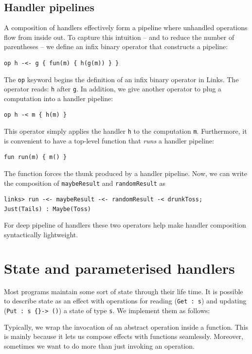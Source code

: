 \documentclass[12pt,mscres,cdtppar,twoside,openright,logo,rightchapter,normalheadings]{infthesis}
\theoremstyle{definition}
\begin{document}
\subsection{Handler pipelines}
A composition of handlers effectively form a pipeline where unhandled
operations flow from inside out. To capture this intuition -- and to
reduce the number of parentheses -- we define an infix binary operator
that constructs a pipeline:
%
\begin{lstlisting}
op h -<- g { fun(m) { h(g(m)) } }
\end{lstlisting}
%
The \lstinline$op$ keyword begins the definition of an infix binary
operator in Links. The operator reads: \lstinline$h$ after
\lstinline$g$. In addition, we give another operator to plug a
computation into a handler pipeline:
%
\begin{lstlisting}
op h -< m { h(m) }
\end{lstlisting}
%
This operator simply applies the handler \lstinline$h$ to the
computation \lstinline$m$. Furthermore, it is convenient to have a
top-level function that \emph{runs} a handler pipeline:
%
\begin{lstlisting}
fun run(m) { m() }
\end{lstlisting}
%
The function forces the thunk produced by a handler pipeline. Now, we
can write the composition of \lstinline$maybeResult$ and
\lstinline$randomResult$ as
%
\begin{lstlisting}[style=terminal]
links> run -<- maybeResult -<- randomResult -< drunkToss;
Just(Tails) : Maybe(Toss)
\end{lstlisting}
%
For deep pipeline of handlers these two operators help make handler
composition syntactically lightweight.

\section{State and parameterised handlers}
\label{sec:parameterised-handlers}

Most programs maintain some sort of state through their life time. It
is possible to describe state as an effect with operations for reading
(\lstinline$Get : s$) and updating (\lstinline$Put : s {}-> ()$) a
state of type \lstinline$s$. We implement them as follows:
%

%
Typically, we wrap the invocation of an abstract operation inside a
function. This is mainly because it lets us compose effects with
functions seamlessly. Moreover, sometimes we want to do more than just
invoking an operation.  
\end{document}
